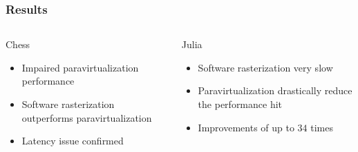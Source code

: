 \providecommand{\chesskeyone}{$60\times60$ tiles}
\providecommand{\chesskeytwo}{$84\times84$ tiles}
\providecommand{\chesskeythree}{$118\times118$ tiles}

\providecommand{\juliakeyone}{$225$ iterations}
\providecommand{\juliakeytwo}{$450$ iterations}
\providecommand{\juliakeythree}{$900$ iterations}

\begin{frame}
  \frametitle{Results}

  \begin{columns}

    \begin{block}{Chess}
      \begin{itemize}
      \item Impaired paravirtualization performance
      \item Software rasterization outperforms paravirtualization
      \item Latency issue confirmed
      \end{itemize}
    \end{block}

    \begin{block}{Julia}
      \begin{itemize}
      \item Software rasterization very slow
      \item Paravirtualization drastically reduce the performance hit
      \item Improvements of up to $34$ times
      \end{itemize}
    \end{block}
  \end{columns}

\end{frame}
